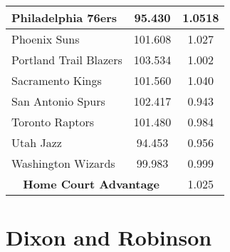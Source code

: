 \begin{table}[t]
\begin{tabular}{|l|c|c|}
Philadelphia 76ers & 95.430 & 1.0518\\ \hline
Phoenix Suns & 101.608 & 1.027\\ \hline
Portland Trail Blazers & 103.534 & 1.002\\ \hline
Sacramento Kings & 101.560 & 1.040\\ \hline
San Antonio Spurs & 102.417 & 0.943\\ \hline
Toronto Raptors & 101.480 & 0.984 \\ \hline
Utah Jazz & 94.453 & 0.956\\ \hline
Washington Wizards & 99.983 & 0.999\\ \hline
\multicolumn{2}{|c|}{\textbf{Home Court Advantage}} & 1.025\\ \hline
\end{tabular}
\label{table:dc_141516}
\end{table}

\section{Dixon and Robinson}

